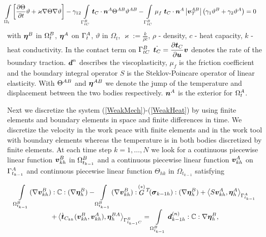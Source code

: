 \documentclass[12pt,a4paper]{scrbook}
\begin{document}
\begin{equation}\label{WeakHeat}
\begin{array}{c}
\begin{array}{l}
 \displaystyle\hspace{-0.5cm}\Int_{\Omega_t}\left[\frac{\partial \Theta}{\partial t} \vartheta  +\varkappa  \nabla \Theta\nabla \vartheta\right]    -\gamma_{12} \Int_{\Gamma_{tC}^{\sl}}\bv{t}_{C}\cdot \bv{n}^{\ms} \Theta^{\ms \sl}\vartheta^{\ms \sl} - \Int_{\Gamma^{\sl}_{tC}}\mu_f~ \bv{t}_{C}\cdot \bv{n}^{\ms} \left| \bv{v}^{\ms \sl}_{\ct}\right|\left(\gamma_{1}\vartheta^{\sl}+\gamma_{2}\vartheta^{\ms}\right)=0
\end{array}
\end{array}
\end{equation}
with $\bv{\eta}^{\sl}$  in $\Omega_t^{\sl}$,  $\bv{\eta}^{\ms}$ on $\Gamma_t^{\ms}$, $\vartheta$ in  $\Omega_t$, $\varkappa:=\frac{k}{\rho c}$, $\rho$ - density, $c$ - heat  capacity, $k$ - heat conductivity.   In the contact term on $\Gamma^{\sl}_{tC}$ $\dot{\bv{t}_{C}}=\dfrac{\partial \bv{t}_{C}}{\partial \bv{u}} \bv{v}$ denotes the rate of the boundary traction. $\bv{d}^n$  describes the viscoplasticity, $\mu_f$ is the friction coefficient and the boundary integral operator $S$ is the Steklov-Poincare operator of linear elasticity. With $\Theta^{\ms \sl}$ and  $\bv{\eta}^{\ms \sl}$ we denote the jump of the temperature and displacement between the two bodies respectively. $\bv{n}^{\ms}$ is the exterior for $\Omega^{\ms}_t$.

Next we discretize the system  (\ref{WeakMech})-(\ref{WeakHeat}) by using finite elements and boundary elements in space and finite differences in time. We discretize the velocity in the work peace with finite elements and in the work tool with boundary elements whereas the temperature is in both bodies discretized by finite elements. At each time step $k=1,\ldots,N$ we look for a continuous piecewise linear function  $\bv{v}^{\sl}_{kh}$ in $\Omega^{\sl}_{t_{k-1}}$ and a  continuous piecewise linear function $\bv{v}^{\ms}_{kh}$ on $\Gamma^{\ms}_{t_{k-1}}$ and continuous piecewise linear function $\Theta_{hk}$ in $\Omega_{t_{k-1}}$ satisfying

\begin{equation}\label{DiscrWeakMech}
\begin{array}{c}
\begin{array}{l}
\displaystyle\Int_{\Omega_{t_{k-1}}^{\sl}}(\nabla \bv{v}_{kh}^{\sl}):\C:(\nabla \bv{\eta}_h^{\sl}) - \Int_{\Omega_{t_{k-1}}^{\sl}}(\nabla \bv{v}_{kh}^{\sl}): \,\stackrel{(*)}{G}\!{}^T\!(\bv{\sigma}_{{k-1}h}):(\nabla \bv{\eta}_h^{\sl})+\left\langle S \bv{v}_{kh}^{\ms},\bv{\eta}_h^{\ms}\right\rangle_{\Gamma^{\ms}_{t_{k-1}}} 
\end{array}
  \\ [2ex]
\begin{array}{r}
\displaystyle+\left\langle\dot{\bv{t}}_{C_{kh}} (\bv{v}_{kh}^{\sl},\bv{v}_{kh}^{\ms}), \bv{\eta}_h^{\sl \ms}\right\rangle_{\Gamma^{\sl}_{t_{k-1}C}}
=\Int_{\Omega_{t_{k-1}}^{\sl}}\bv{d}_{k-1h}^{(n)}  : \C : \nabla \bv{\eta}_h^{\sl},
\end{array}
\end{array}
\end{equation}
\end{document}
